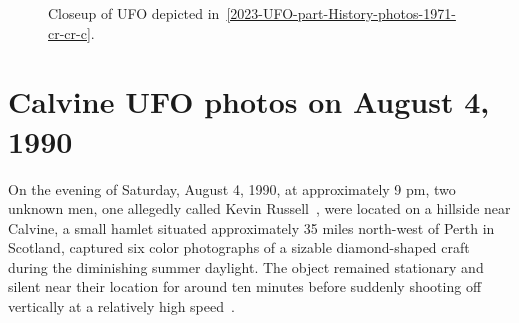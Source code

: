 %
\begin{figure}[b]
\sidecaption
%
%
\caption{Closeup of UFO depicted in~\ref{2023-UFO-part-History-photos-1971-cr-cr-c}.}
\label{2023-UFO-part-History-photos-1971-cr-cr-cu}       %
\end{figure}



\clearpage




\section{Calvine  UFO photos  on August 4,  1990}
\label{2023-UFO-part-History-photos-1990-ca}

On the evening of Saturday, August 4,  1990, at approximately 9 pm,
two unknown men, one allegedly called Kevin Russell~\cite{YTDTMarch23}, were  located on a hillside near Calvine, a small hamlet situated approximately 35 miles north-west of Perth in Scotland,
captured six color photographs of a sizable diamond-shaped craft during the diminishing summer daylight.
The object remained stationary and silent near their location for around
ten minutes before suddenly shooting off vertically at a relatively high speed~\cite{AdamsCalvin20222Aug,ClarkeCalvin22,YTDTMarch23}.

